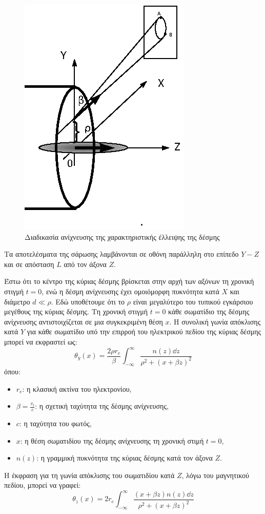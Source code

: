 \begin{figure}[tph]
	\includegraphics[width=0.6\linewidth]{figures/Logatchov1999-EBS}
	\centering
	\caption{Διαδικασία ανίχνευσης της χαρακτηριστικής έλλειψης της δέσμης}
	\label{fig:ellipse-EBS}
\end{figure}

Τα αποτελέσματα της σάρωσης λαμβάνονται σε οθόνη παράλληλη στο επίπεδο $Y-Z$ και σε απόσταση $L$ από τον άξονα $Z$.

Έστω ότι το κέντρο της κύριας δέσμης βρίσκεται στην αρχή των αξόνων τη χρονική στιγμή $t = 0$, ενώ η δέσμη ανίχνευσης έχει ομοιόμορφη πυκνότητα κατά $X$ και διάμετρο $d \ll \rho$.
Εδώ υποθέτουμε ότι το $\rho$ είναι μεγαλύτερο του τυπικού εγκάρσιου μεγέθους της κύριας δέσμης.
Τη χρονική στιγμή $t = 0$ κάθε  σωματίδιο της δέσμης ανίχνευσης αντιστοιχίζεται σε μια συγκεκριμένη θέση $x$.
Η συνολική γωνία απόκλισης κατά $Y$ για κάθε σωματίδιο υπό την επιρροή του ηλεκτρικού πεδίου της κύριας δέσμης μπορεί να εκφραστεί ως\cite{Logatchov1999}:
\begin{equation}
\theta_y (x) = \frac{2 \rho r_e}{\beta} \int_{-\infty}^{\infty}\frac{n(z) \dd z}{\rho^2 + \left(x+\beta z \right) ^2}
\end{equation}
όπου:
\begin{itemize}
\item $r_e$: η κλασική ακτίνα του ηλεκτρονίου,
\item $\beta =\frac{v_t}{c}$: η σχετική ταχύτητα της δέσμης ανίχνευσης,
\item $c$: η ταχύτητα του φωτός,
\item $x$: η θέση σωματιδίου της δέσμης ανίχνευσης τη χρονική στιμή $t=0$,
\item $n(z)$: η γραμμική πυκνότητα της κύριας δέσμης κατά τον άξονα $Z$.
\end{itemize} 

Η έκφραση για τη γωνία απόκλισης του σωματιδίου κατά $Z$, λόγω του μαγνητικού πεδίου, μπορεί να γραφεί\cite{Logatchov1999}:
\begin{equation}
\theta_z(x) = 2 r_e \int_{-\infty}^{\infty}\frac{(x+\beta z)n(z) \dd z}{\rho^2 + \left(x+\beta z \right) ^2}
\end{equation}